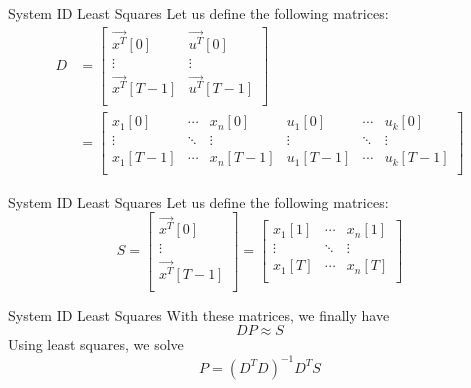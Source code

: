 \begin{frame}{System ID Least Squares}
	Let us define the following matrices:
	\begin{align*}
		D
		& =
		\begin{bmatrix}
			\vec{x^T}[0] & \vec{u^T}[0] \\
			\vdots & \vdots \\
			\vec{x^T}[T-1] & \vec{u^T}[T-1] \\
		\end{bmatrix}
		\\ & =
		\begin{bmatrix}
			x_1[0] & \cdots & x_n[0] & u_1[0] & \cdots & u_k[0] \\
			\vdots & \ddots & \vdots & \vdots & \ddots & \vdots \\
			x_1[T-1] & \cdots & x_n[T-1] & u_1[T-1] & \cdots & u_k[T-1] \\
		\end{bmatrix}
	\end{align*}
\end{frame}

\begin{frame}{System ID Least Squares}
	Let us define the following matrices:
	\[
		S
		=
		\begin{bmatrix}
			\vec{x^T}[0] \\
			\vdots \\
			\vec{x^T}[T-1] \\
		\end{bmatrix}
		=
		\begin{bmatrix}
			x_1[1] & \cdots & x_n[1] \\
			\vdots & \ddots & \vdots \\
			x_1[T] & \cdots & x_n[T] \\
		\end{bmatrix}
	\]
\end{frame}

\begin{frame} {System ID Least Squares}
	With these matrices, we finally have
	\[
	DP \approx S
	\]
	Using least squares, we solve
	\[
	P = \left( D^T D \right) ^ {-1} D^T S
	\]
\end{frame}